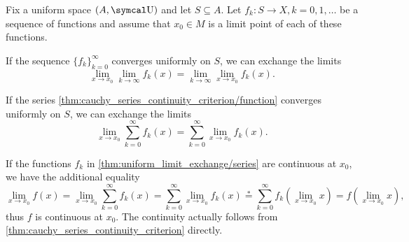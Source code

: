 \begin{theorem}\label{thm:uniform_limit_exchange}\cite[]{Фихтенгольц1968/2}
  Fix a uniform space \( (A, \U) \) and let \( S \subseteq A \). Let \( f_k: S \to X, k = 0, 1, \ldots \) be a sequence of functions and assume that \( x_0 \in M \) is a limit point of each of these functions.

  \begin{thmenum}
     If the sequence \( \{ f_k \}_{k=0}^\infty \) converges uniformly on \( S \), we can exchange the limits
    \begin{equation*}
      \lim_{x \to x_0} \lim_{k \to \infty} f_k(x)
      =
      \lim_{k \to \infty} \lim_{x \to x_0} f_k(x).
    \end{equation*}

     If the series \cref{thm:cauchy_series_continuity_criterion/function} converges uniformly on \( S \), we can exchange the limits
    \begin{equation*}
      \lim_{x \to x_0} \sum_{k=0}^\infty f_k(x)
      =
      \sum_{k=0}^\infty \lim_{x \to x_0} f_k(x).
    \end{equation*}
  \end{thmenum}
\end{theorem}

\begin{remark}\label{remark:thm:uniform_limit_exchange_continuity}
  If the functions \( f_k \) in \cref{thm:uniform_limit_exchange/series} are continuous at \( x_0 \), we have the additional equality
  \begin{equation}\label{thm:uniform_limit_exchange/continuous_equality}
    \lim_{x \to x_0} f(x)
    =
    \lim_{x \to x_0} \sum_{k=0}^\infty f_k(x)
    =
    \sum_{k=0}^\infty \lim_{x \to x_0} f_k(x)
    \overset * =
    \sum_{k=0}^\infty f_k\left(\lim_{x \to x_0} x \right)
    =
    f\left(\lim_{x \to x_0} x \right),
  \end{equation}
  thus \( f \) is continuous at \( x_0 \). The continuity actually follows from \cref{thm:cauchy_series_continuity_criterion} directly.
\end{remark}

